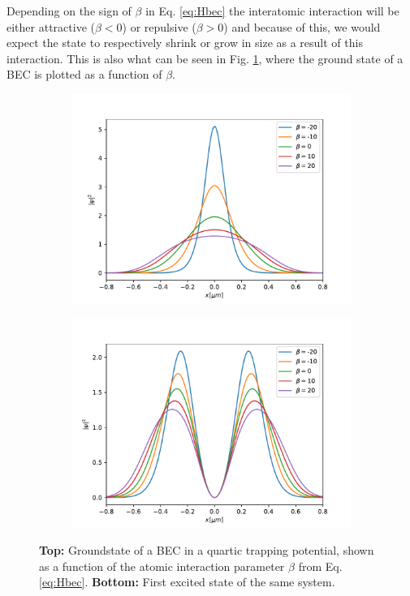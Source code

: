 \documentclass[a4paper, twocolumn]{revtex4-1}
\begin{document}
Depending on the sign of $\beta$ in Eq. \eqref{eq:Hbec} the interatomic interaction will be either attractive ($\beta<0$) or repulsive ($\beta>0$) and because of this, we would expect the state to respectively shrink or grow in size as a result of this interaction. This is also what can be seen in Fig. \ref{fig:BECstates}, where the ground state of a BEC is plotted as a function of $\beta$.
\begin{figure}[h]
	\begin{subfigure}{\columnwidth}
		\includegraphics[width=\columnwidth]{graphics/stateAnalysis/GroundstateBeta.pdf}
	\end{subfigure}
	\begin{subfigure}{\columnwidth}
		\includegraphics[width=\columnwidth]{graphics/stateAnalysis/ExcitedstateBeta.pdf}
	\end{subfigure}
	\caption{\textbf{Top:} Groundstate of a BEC in a quartic trapping potential, shown as a function of the atomic interaction parameter $\beta$ from Eq. \eqref{eq:Hbec}. \textbf{Bottom:} First excited state of the same system.}
	\label{fig:BECstates}
\end{figure}
\end{document}

